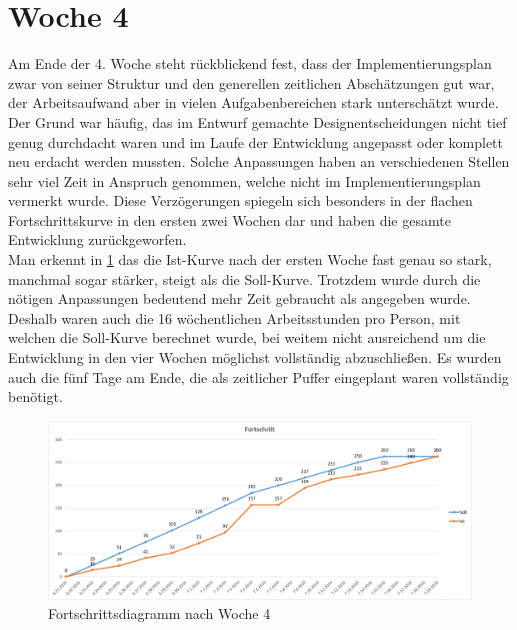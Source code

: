 \section{Woche 4}
Am Ende der 4. Woche steht rückblickend fest, dass der Implementierungsplan zwar von seiner Struktur und den generellen zeitlichen Abschätzungen gut war, der Arbeitsaufwand aber in vielen Aufgabenbereichen stark unterschätzt wurde. Der Grund war häufig, das im Entwurf gemachte Designentscheidungen nicht tief genug durchdacht waren und im Laufe der Entwicklung angepasst oder komplett neu erdacht werden mussten. Solche Anpassungen haben an verschiedenen Stellen sehr viel Zeit in Anspruch genommen, welche nicht im Implementierungsplan vermerkt wurde. Diese Verzögerungen spiegeln sich besonders in der flachen Fortschrittskurve in den ersten zwei Wochen dar und haben die gesamte Entwicklung zurückgeworfen. \\
Man erkennt in \ref{fig:week_four_table} das die Ist-Kurve nach der ersten Woche fast genau so stark, manchmal sogar stärker, steigt als die Soll-Kurve. Trotzdem wurde durch die nötigen Anpassungen bedeutend mehr Zeit gebraucht als angegeben wurde. Deshalb waren auch die 16 wöchentlichen Arbeitsstunden pro Person, mit welchen die Soll-Kurve berechnet wurde, bei weitem nicht ausreichend um die Entwicklung in den vier Wochen möglichst vollständig abzuschließen. Es wurden auch die fünf Tage am Ende, die als zeitlicher Puffer eingeplant waren vollständig benötigt.
\begin{figure}[!htbp]
	\centering
	\includegraphics[width=380pt]{resourcen/week_four_diagram.PNG}
	\caption{Fortschrittsdiagramm nach Woche 4}
	\label{fig:week_four_table}
\end{figure}

